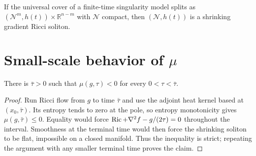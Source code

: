 \begin{remark}
\label{rem:chow-iii-ch17-compact-factor-shrinker}
If the universal cover of a finite-time singularity model splits as
$(\mathcal N^m,h(t))\times\mathbb R^{n-m}$ with $\mathcal N$ compact, then
$(\mathcal N,h(t))$ is a shrinking gradient Ricci soliton.
\end{remark}

\section{Small-scale behavior of \texorpdfstring{$\mu$}{mu}}

\begin{lemma}
\label{lem:chow-iii-ch17-mu-negative-small-scale}
There is $\bar\tau>0$ such that $\mu(g,\tau)<0$ for every
$0<\tau<\bar\tau$.
\end{lemma}
\begin{proof}
Run Ricci flow from $g$ to time $\bar\tau$ and use the adjoint heat kernel
based at $(x_0,\bar\tau)$.  Its entropy tends to zero at the pole, so entropy
monotonicity gives $\mu(g,\bar\tau)\le0$.  Equality would force
$\operatorname{Ric}+\nabla^2f-g/(2\tau)=0$ throughout the interval.  Smoothness at the
terminal time would then force the shrinking soliton to be flat, impossible
on a closed manifold.  Thus the inequality is strict; repeating the argument
with any smaller terminal time proves the claim.
\end{proof}

